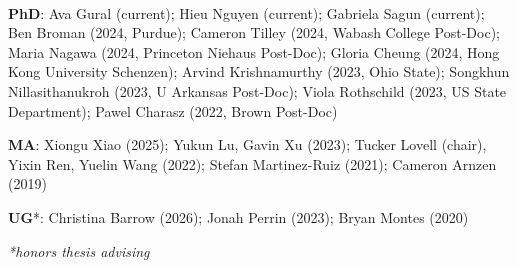 \documentclass[11pt]{article}
\begin{document}
\vspace{.3in}
\begin{minipage}[t]{.21\textwidth}
	\flushright
	 \hspace*{.2in}  \\
\end{minipage}
\begin{minipage}[t]{.79\textwidth}
	 \textbf{PhD}: Ava Gural (current); Hieu Nguyen (current); Gabriela Sagun (current); Ben Broman (2024, Purdue); Cameron Tilley (2024, Wabash College Post-Doc); Maria Nagawa (2024, Princeton Niehaus Post-Doc); Gloria Cheung (2024, Hong Kong University Schenzen); Arvind Krishnamurthy (2023, Ohio State); Songkhun Nillasithanukroh (2023, U Arkansas Post-Doc); Viola Rothschild (2023, US State Department); Pawel Charasz (2022, Brown Post-Doc) \\
	 \vspace{-.05in}

	 \textbf{MA}: Xiongu Xiao (2025); Yukun Lu, Gavin Xu (2023); Tucker Lovell (chair), Yixin Ren, Yuelin Wang (2022); Stefan Martinez-Ruiz (2021); Cameron Arnzen (2019)    \\
	 \vspace{-.05in}

	 \textbf{UG}*: Christina Barrow (2026); Jonah Perrin (2023); Bryan Montes (2020) \\
	 \vspace{-.2in}

 	\emph{*\scriptsize honors thesis advising}	\\

\end{minipage}

\end{document}
